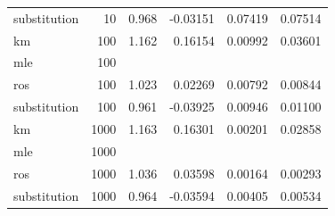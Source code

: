 \documentclass[12pt, twoside]{amherstthesis}
\begin{document}
\begin{table}
\begin{tabular}[t]{lrrrrr}
\hspace{1em}substitution & 10 & 0.968 & -0.03151 & 0.07419 & 0.07514\\
\hspace{1em}km & 100 & 1.162 & 0.16154 & 0.00992 & 0.03601\\
\hspace{1em}mle & 100 &  &  &  & \\
\hspace{1em}ros & 100 & 1.023 & 0.02269 & 0.00792 & 0.00844\\
\hspace{1em}substitution & 100 & 0.961 & -0.03925 & 0.00946 & 0.01100\\
\hspace{1em}km & 1000 & 1.163 & 0.16301 & 0.00201 & 0.02858\\
\hspace{1em}mle & 1000 &  &  &  & \\
\hspace{1em}ros & 1000 & 1.036 & 0.03598 & 0.00164 & 0.00293\\
\hspace{1em}substitution & 1000 & 0.964 & -0.03594 & 0.00405 & 0.00534\\
\bottomrule
\end{tabular}
\end{table}
\end{document}
